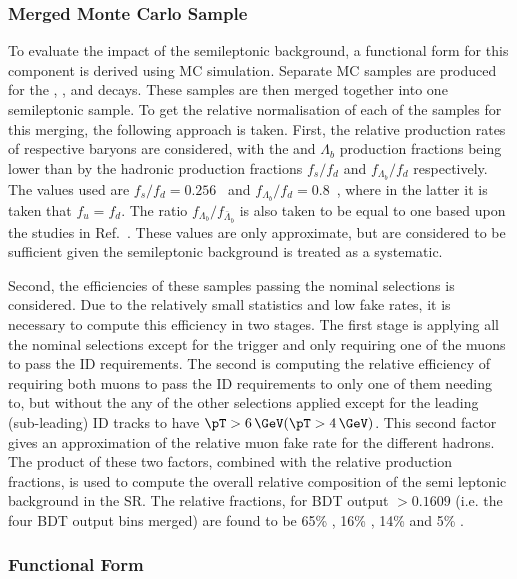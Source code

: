 \subsubsection{Merged Monte Carlo Sample}
\label{subsec:SemiLepMCmerging}

To evaluate the impact of the semileptonic background, a functional form for this component is derived using MC simulation. 
Separate MC samples are produced for the \BdPiMuNu, \BsKMuNu, \LPMuNu and \AntiLPMuNu decays. 
These samples are then merged together into one semileptonic sample. 
To get the relative normalisation of each of the samples for this merging, the following approach is taken. 
First, the relative production rates of respective baryons are considered, with the \Bs and $\Lambda_{b}$ production fractions being lower than \Bd by the hadronic production fractions $f_{s}/f_{d}$ and $f_{\Lambda_{b}}/f_{d}$ respectively. 
The values used are $f_{s}/f_{d} = 0.256$~\cite{HFLAV:2016hnz} and $f_{\Lambda_{b}}/f_{d} = 0.8$~\cite{LHCb:2011leg}, where in the latter it is taken that $f_{u} = f_{d}$.
The ratio  $f_{\Lambda_{b}}/f_{\bar{\Lambda}_{b}}$ is also taken to be equal to one based upon the studies in Ref.~\cite{CMS:2012wje}.
These values are only approximate, but are considered to be sufficient given the semileptonic background is treated as a systematic. 

Second, the efficiencies of these samples passing the nominal selections is considered. 
Due to the relatively small statistics and low fake rates, it is necessary to compute this efficiency in two stages. 
The first stage is applying all the nominal selections except for the trigger and only requiring one of the muons to pass the ID requirements. 
The second is computing the relative efficiency of requiring both muons to pass the ID requirements to only one of them needing to, but without the any of the other selections applied except for the leading (sub-leading) ID tracks to have $\pT > 6\,\GeV (\pT > 4\,\GeV)$. 
This second factor gives an approximation of the relative muon fake rate for the different hadrons. 
The product of these two factors, combined with the relative production fractions, is used to compute the overall relative composition of the semi leptonic background in the SR. 
The relative fractions, for BDT output $>0.1609$ (i.e. the four BDT output bins merged) are found to be 65\% \BdPiMuNu, 16\% \AntiLPMuNu, 14\% \BsKMuNu and 5\% \LPMuNu.  


\subsubsection{Functional Form}
\label{subsec:SemiLepFunctionalForm}

